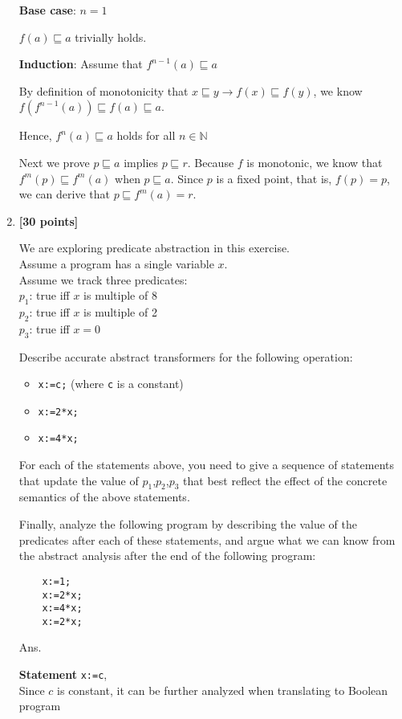 \documentclass{article}
\begin{document}
\begin{enumerate}
\textbf{Base case}: $n = 1$

$f(a) \sqsubseteq a$ trivially holds.

\textbf{Induction}: Assume that $f^{n-1}(a) \sqsubseteq a$

By definition of monotonicity that $x \sqsubseteq y \to f(x) \sqsubseteq f(y)$,
we know $f(f^{n-1}(a)) \sqsubseteq f(a) \sqsubseteq a$.

Hence, $f^n(a) \sqsubseteq a$ holds for all $n \in \mathbb{N}$

Next we prove $p \sqsubseteq a$ implies $p \sqsubseteq r$.
Because $f$ is monotonic,
we know that $f^m(p) \sqsubseteq f^m(a)$ when $p \sqsubseteq a$.
Since $p$ is a fixed point, that is, $f(p) = p$,
we can derive that $p \sqsubseteq f^m(a) = r$. 

\item \textbf{[30 points]}

We are exploring predicate abstraction in this exercise. \\
Assume a program has a single variable $x$. \\
Assume we track three predicates:\\
$p_1$: true iff $x$ is multiple of 8\\
$p_2$: true iff $x$ is multiple of 2\\
$p_3$: true iff $x = 0$

Describe accurate abstract transformers for the following operation:
\begin{itemize}
    \item \verb|x:=c;| (where \verb|c| is a constant)
    \item \verb|x:=2*x;|
    \item \verb|x:=4*x;|
\end{itemize}

For each of the statements above, you need to give a sequence of statements that
update the value of $p_1$,$p_2$,$p_3$ that best reflect the effect of the
concrete semantics of the above statements.

Finally, analyze the following program by describing the value of the predicates
after each of these statements, and argue what we can know from the abstract
analysis after the end of the following program:
\begin{verbatim}
    x:=1;
    x:=2*x;
    x:=4*x;
    x:=2*x;
\end{verbatim}

\medskip
Ans.
\medskip

\textbf{Statement} \verb|x:=c|, \\
Since $c$ is constant, it can be further analyzed when translating to Boolean program


\end{enumerate}
\end{document}
